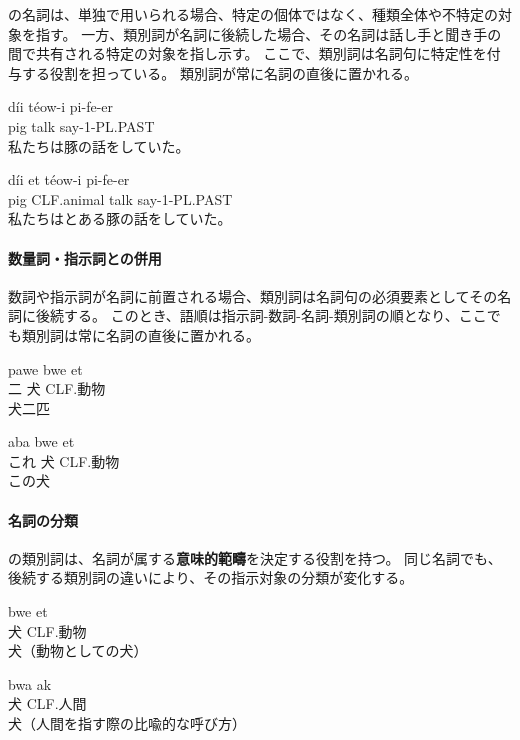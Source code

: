 \langname の名詞は、単独で用いられる場合、特定の個体ではなく、種類全体や不特定の対象を指す。
一方、類別詞が名詞に後続した場合、その名詞は話し手と聞き手の間で共有される特定の対象を指し示す。
ここで、類別詞は名詞句に特定性を付与する役割を担っている。
類別詞が常に名詞の直後に置かれる。
\begin{exe}
\ex \gll d\'ii t\'eow-i pi-fe-er\\
pig talk say-1-PL.PAST \\
\glt 私たちは豚の話をしていた。
\end{exe}
\begin{exe}
\ex \gll d\'ii et t\'eow-i pi-fe-er\\
pig CLF.animal talk say-1-PL.PAST \\
\glt 私たちはとある豚の話をしていた。
\end{exe}

\paragraph{数量詞・指示詞との併用}

数詞や指示詞が名詞に前置される場合、類別詞は名詞句の必須要素としてその名詞に後続する。
このとき、語順は指示詞-数詞-名詞-類別詞の順となり、ここでも類別詞は常に名詞の直後に置かれる。
\begin{exe}
\ex \gll pawe bwe et\\
二 犬 CLF.動物\\
\glt 犬二匹
\end{exe}
\begin{exe}
\ex \gll aba bwe et\\
これ 犬 CLF.動物\\
\glt この犬
\end{exe}


\paragraph{名詞の分類}

\langname の類別詞は、名詞が属する\textbf{意味的範疇}を決定する役割を持つ。
同じ名詞でも、後続する類別詞の違いにより、その指示対象の分類が変化する。
\begin{exe}
\ex \gll bwe et\\
犬 CLF.動物\\
\glt 犬（動物としての犬）
\end{exe}
\begin{exe}
\ex \gll bwa ak\\
犬 CLF.人間\\
\glt 犬（人間を指す際の比喩的な呼び方）
\end{exe}